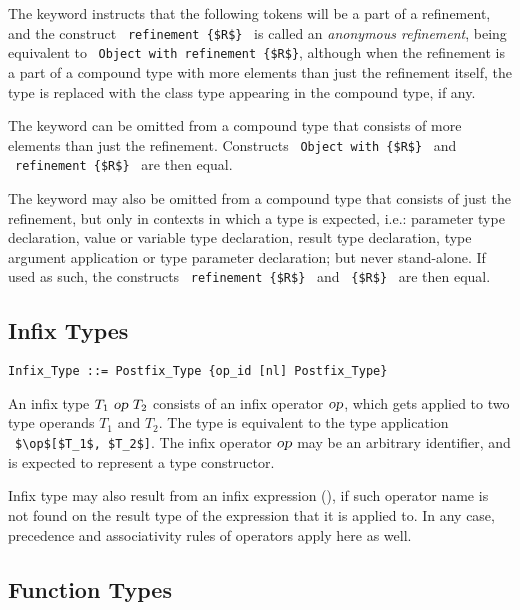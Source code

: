 The keyword  instructs that the following tokens will be a part of a refinement, and the construct ~\lstinline!refinement {$R$}!~ is called an {\em anonymous refinement}, being equivalent to ~\lstinline!Object with refinement {$R$}!, although when the refinement is a part of a compound type with more elements than just the refinement itself, the  type is replaced with the class type appearing in the compound type, if any. 

The  keyword can be omitted from a compound type that consists of more elements than just the refinement. Constructs ~\lstinline!Object with {$R$}!~ and ~\lstinline!refinement {$R$}!~ are then equal. 

The  keyword may also be omitted from a compound type that consists of just the refinement, but only in contexts in which a type is expected, i.e.: parameter type declaration, value or variable type declaration, result type declaration, type argument application or type parameter declaration; but never stand-alone. If used as such, the constructs ~\lstinline!refinement {$R$}!~ and ~\lstinline!{$R$}!~ are then equal. 






\subsection{Infix Types}
\label{sec:infix-types}

\syntax\begin{lstlisting}
Infix_Type ::= Postfix_Type {op_id [nl] Postfix_Type}
\end{lstlisting}

An infix type $T_1\ \mbox{\sl op}\ T_2$ consists of an infix operator $\mbox{\sl op}$, which gets applied to two type operands $T_1$ and $T_2$. The type is equivalent to the type application ~\lstinline!$\op$[$T_1$, $T_2$]!. The infix operator $\mbox{\sl op}$ may be an arbitrary identifier, and is expected to represent a type constructor. 

Infix type may also result from an infix expression (), if such operator name is not found on the result type of the expression that it is applied to. In any case, precedence and associativity rules of operators apply here as well. 






\subsection{Function Types}
\label{sec:function-types}

